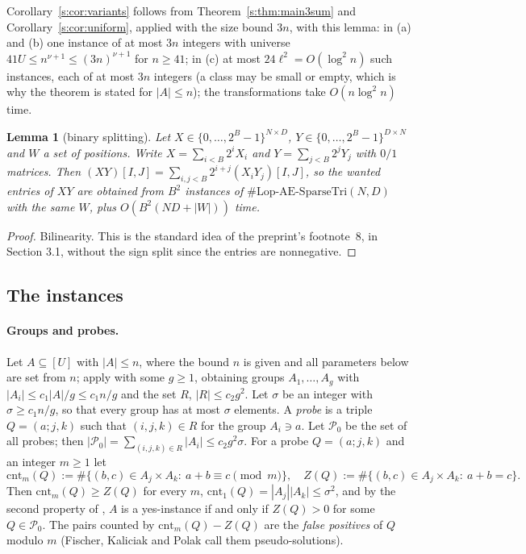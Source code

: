 \documentclass[11pt]{article}
\newtheorem{lemma}[theorem]{Lemma}
\theoremstyle{definition}
\theoremstyle{remark}
\newcommand{\Lop}{\mathrm{Lop}\text{-}\allowbreak\mathrm{AE}\text{-}\allowbreak\mathrm{SparseTri}}
\newcommand{\cnt}{\mathrm{cnt}}
\newcommand{\Pq}{\mathcal{P}}
\begin{document}
Corollary~\ref{s:cor:variants} follows from Theorem~\ref{s:thm:main3sum} and Corollary~\ref{s:cor:uniform}, applied with the size bound $3n$, with this lemma: in (a) and (b) one instance of at most $3n$ integers with universe $41U\le n^{\nu+1}\le(3n)^{\nu+1}$ for $n\ge41$; in (c) at most $24\ell^2=O(\log^2n)$ such instances, each of at most $3n$ integers (a class may be small or empty, which is why the theorem is stated for $|A|\le n$); the transformations take $O(n\log^2 n)$ time.

\begin{lemma}[binary splitting]\label{s:lem:split}
Let $X\in\{0,\dots,2^B-1\}^{N\times D}$, $Y\in\{0,\dots,2^B-1\}^{D\times N}$ and $W$ a set of positions. Write $X=\sum_{i<B}2^iX_i$ and $Y=\sum_{j<B}2^jY_j$ with $0/1$ matrices. Then $(XY)[I,J]=\sum_{i,j<B}2^{i+j}(X_iY_j)[I,J]$, so the wanted entries of $XY$ are obtained from $B^2$ instances of $\#\Lop(N,D)$ with the same $W$, plus $O(B^2(ND+|W|))$ time.
\end{lemma}
\begin{proof}
Bilinearity. This is the standard idea of the preprint's footnote~8, in Section 3.1, without the sign split since the entries are nonnegative.
\end{proof}

\subsection{The instances}\label{s:sec:instances}

\paragraph{Groups and probes.} Let $A\subseteq[U]$ with $|A|\le n$, where the bound $n$ is given and all parameters below are set from $n$; apply \cite[Lemma~3.3]{FKP24} with some $g\ge1$, obtaining groups $A_1,\dots,A_g$ with $|A_i|\le c_1|A|/g\le c_1n/g$ and the set $R$, $|R|\le c_2g^2$. Let $\sigma$ be an integer with $\sigma\ge c_1n/g$, so that every group has at most $\sigma$ elements. A \emph{probe} is a triple $Q=(a;j,k)$ such that $(i,j,k)\in R$ for the group $A_i\ni a$. Let $\Pq_0$ be the set of all probes; then $|\Pq_0|=\sum_{(i,j,k)\in R}|A_i|\le c_2g^2\sigma$. For a probe $Q=(a;j,k)$ and an integer $m\ge1$ let
\[
\cnt_m(Q):=\#\{(b,c)\in A_j\times A_k:\ a+b\equiv c\pmod m\},\quad
Z(Q):=\#\{(b,c)\in A_j\times A_k:\ a+b=c\}.
\]
Then $\cnt_m(Q)\ge Z(Q)$ for every $m$, $\cnt_1(Q)=|A_j||A_k|\le\sigma^2$, and by the second property of \cite[Lemma~3.3]{FKP24}, $A$ is a yes-instance if and only if $Z(Q)>0$ for some $Q\in\Pq_0$. The pairs counted by $\cnt_m(Q)-Z(Q)$ are the \emph{false positives} of $Q$ modulo $m$ (Fischer, Kaliciak and Polak call them pseudo-solutions).
\end{document}
